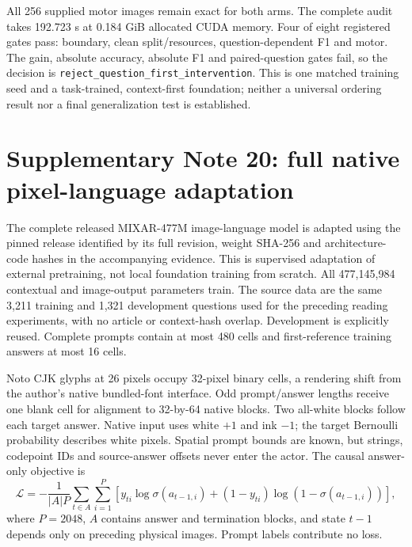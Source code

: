 \documentclass[10pt,a4paper]{article}
\begin{document}
All 256 supplied motor images remain exact for both arms. The complete audit
takes 192.723 s at 0.184 GiB allocated CUDA memory. Four of eight registered
gates pass: boundary, clean split/resources, question-dependent F1 and motor.
The gain, absolute accuracy, absolute F1 and paired-question gates fail, so
the decision is \texttt{reject\_question\_first\_intervention}. This is one
matched training seed and a task-trained, context-first foundation; neither a
universal ordering result nor a final generalization test is established.


\section*{Supplementary Note 20: full native pixel-language adaptation}
The complete released MIXAR-477M\cite{mixar} image-language model is adapted
using the pinned release identified by its full revision, weight SHA-256 and
architecture-code hashes in the accompanying evidence. This is
supervised adaptation of external pretraining, not local foundation training
from scratch. All 477,145,984 contextual and image-output parameters train.
The source data are the same 3,211 training and 1,321 development questions
used for the preceding reading experiments, with no article or context-hash
overlap. Development is explicitly reused. Complete prompts contain at most
480 cells and first-reference training answers at most 16 cells.

Noto CJK glyphs at 26 pixels occupy 32-pixel binary cells, a rendering shift
from the author's native bundled-font interface. Odd prompt/answer lengths
receive one blank cell for alignment to 32-by-64 native blocks. Two all-white
blocks follow each target answer. Native input uses white $+1$ and ink $-1$;
the target Bernoulli probability describes white pixels. Spatial prompt bounds
are known, but strings, codepoint IDs and source-answer offsets never enter
the actor. The causal answer-only objective is
\begin{equation}
\mathcal L=-\frac{1}{|A|P}\sum_{t\in A}\sum_{i=1}^{P}
\left[y_{ti}\log\sigma(a_{t-1,i})+(1-y_{ti})\log(1-\sigma(a_{t-1,i}))\right],
\end{equation}
where $P=2048$, $A$ contains answer and termination blocks, and state $t-1$
depends only on preceding physical images. Prompt labels contribute no loss.
\end{document}
